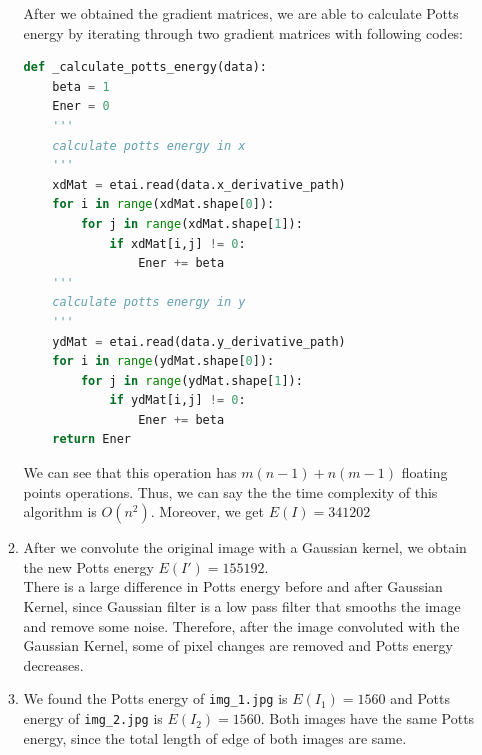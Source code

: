 \documentclass[12pt]{article}
\begin{document}
\begin{enumerate}
\begin{enumerate}
After we obtained the gradient matrices, we are able to calculate Potts energy by iterating through two gradient matrices with following codes:
\begin{lstlisting}[language=Python]
def _calculate_potts_energy(data):
	beta = 1
	Ener = 0
	'''
	calculate potts energy in x
	'''
	xdMat = etai.read(data.x_derivative_path)
	for i in range(xdMat.shape[0]):
		for j in range(xdMat.shape[1]):
			if xdMat[i,j] != 0:
				Ener += beta
	'''
	calculate potts energy in y
	'''
	ydMat = etai.read(data.y_derivative_path)
	for i in range(ydMat.shape[0]):
		for j in range(ydMat.shape[1]):
			if ydMat[i,j] != 0:
				Ener += beta
	return Ener
\end{lstlisting} 
	We can see that this operation has $m(n-1)+n(m-1)$ floating points operations. Thus, we can say the the time complexity of this algorithm is $O(n^2)$. Moreover, we get $E(I)=341202$\\
	
	\item After we convolute the original image with a Gaussian kernel, we obtain the new Potts energy $E(I')=155192$.\\
	There is a large difference in Potts energy before and after Gaussian Kernel, since Gaussian filter is a low pass filter that smooths the image and remove some noise. Therefore, after the image convoluted with the Gaussian Kernel, some of pixel changes are removed and Potts energy decreases.\\
	\pagebreak
	\item We found the Potts energy of \texttt{img\_1.jpg} is $E(I_1)=1560$ and Potts energy of \texttt{img\_2.jpg} is $E(I_2)=1560$. Both images have the same Potts energy, since the total length of edge of both images are same.
	\end{enumerate}


\end{enumerate}
\end{document}
